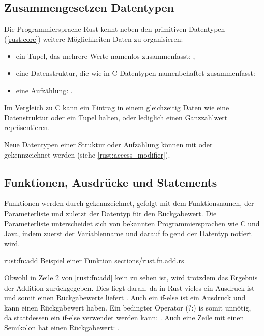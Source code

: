 \subsection{Zusammengesetzen Datentypen}

Die Programmiersprache Rust kennt neben den primitiven  Datentypen (\autoref{rust:core}) weitere Möglichkeiten Daten zu organisieren:
\begin{itemize}
	\item ein Tupel, das mehrere Werte namenlos zusammenfasst: ,
	\item eine Datenstruktur, die wie in C Datentypen namenbehaftet zusammenfasst: \linebreak{}
	\item eine Aufzählung: . 
\end{itemize}

Im Vergleich zu C kann ein Eintrag in einem  gleichzeitig Daten wie eine Datenstruktur oder ein Tupel halten, oder lediglich einen Ganzzahlwert repräsentieren.

Neue Datentypen einer Struktur oder Aufzählung können mit  oder  gekennzeichnet werden (siehe \autoref{rust:access_modifier}).



\subsection{Funktionen, Ausdrücke und Statements}

Funktionen werden durch  gekennzeichnet, gefolgt mit dem Funktionsnamen, der Parameterliste und zuletzt der Datentyp für den Rückgabewert.
Die Parameterliste unterscheidet sich von bekannten Programmiersprachen wie C und Java, indem zuerst der Variablenname und darauf folgend der Datentyp notiert wird.

\rustcinclude
	{rust:fn:add}
	{Beispiel einer Funktion}
	{sections/rust.fn.add.rs}
	
Obwohl in Zeile 2 von \autoref{rust:fn:add} kein  zu sehen ist, wird trotzdem das Ergebnis der Addition zurückgegeben.
Dies liegt daran, da in Rust vieles ein Ausdruck ist und somit einen Rückgabewerte liefert \cite{rust:book:statements}.
Auch ein if-else ist ein Ausdruck und kann einen Rückgabewert haben.
Ein bedingter Operator (?:) is somit unnötig, da stattdessen ein if-else verwendet werden kann: . 
Auch eine Zeile mit einen Semikolon hat einen Rückgabewert: \rustcinline{()}. 

